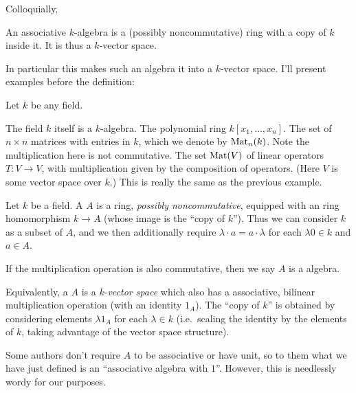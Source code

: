 \documentclass[11pt]{scrreprt}
\begin{document}
Colloquially,
\begin{moral}
	An associative $k$-algebra is
	a (possibly noncommutative) ring with a copy of $k$ inside it.
	It is thus a $k$-vector space.
\end{moral}
In particular this makes such an algebra it into a $k$-vector space.
I'll present examples before the definition:
\begin{example}
	Let $k$ be any field.
	\begin{enumerate}[(a)]
		\ii The field $k$ itself is a $k$-algebra.
		\ii The polynomial ring $k[x_1, \dots, x_n]$.
		\ii The set of $n \times n$ matrices with entries in $k$,
		which we denote by $\mathrm{Mat}_n(k)$.
		Note the multiplication here is not commutative.
		\ii The set $\mathrm{Mat}(V)$ of linear operators $T : V \to V$,
		with multiplication given by the composition of operators.
		(Here $V$ is some vector space over $k$.)
		This is really the same as the previous example.
	\end{enumerate}
\end{example}
\begin{definition}
	Let $k$ be a field.
	A  $A$ is a ring, \emph{possibly noncommutative},
	equipped with an ring homomorphism $k \to A$
	(whose image is the ``copy of $k$'').
	Thus we can consider $k$ as a subset of $A$, and
	we then additionally require $\lambda \cdot a = a \cdot \lambda$
	for each $\lambda0 \in k$ and $a \in A$.

	If the multiplication operation is also commutative,
	then we say $A$ is a  algebra.
\end{definition}
\begin{definition}
	Equivalently, a  $A$ is a
	$k$-\emph{vector space} which also has a associative,
	bilinear multiplication operation (with an identity $1_A$).
	The ``copy of $k$'' is obtained by considering elements
	$\lambda 1_A$ for each $\lambda \in k$
	(i.e.\ scaling the identity by the elements of $k$,
	taking advantage of the vector space structure).
\end{definition}

\begin{abuse}
	Some authors don't require $A$ to be associative or have unit,
	so to them what we have just defined is an
	``associative algebra with $1$''.
	However, this is needlessly wordy for our purposes.
\end{abuse}
\end{document}
